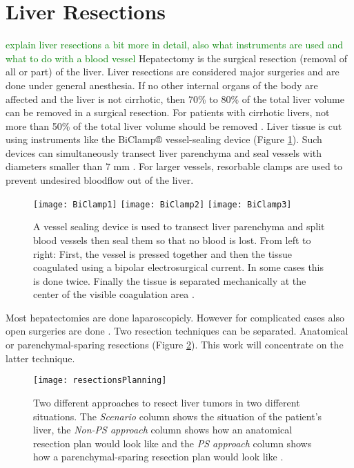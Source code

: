 \section{Liver Resections} 
\textcolor{green}{explain liver resections a bit more in detail, also what instruments are used and what to do with a blood vessel}
Hepatectomy is the surgical resection (removal of all or part) of the liver.
Liver resections are considered major surgeries and are done under general
anesthesia. If no other internal organs of the body are affected and the liver
is not cirrhotic, then 70\% to 80\% of the total liver volume can be removed in a
surgical resection. For patients with cirrhotic livers, not more than 50\% of
the total liver volume should be removed \cite{pianka2011liver}. Liver tissue is
cut using instruments like the BiClamp® vessel-sealing device (Figure \ref{fig:BiClampExplained}). Such devices can
simultaneously transect liver parenchyma and seal vessels with diameters smaller
than 7 mm \cite{zhao2017biclamp}. For larger vessels, resorbable clamps are used
to prevent undesired bloodflow out of the liver.
\begin{figure}[H]
  \centering
  \texttt{[image: BiClamp1]}
  \endminipage
  \hfill
  \texttt{[image: BiClamp2]}
  \endminipage
  \hfill
  \texttt{[image: BiClamp3]}
  \endminipage
  \hfill 
 \caption{A vessel sealing device is used to transect liver parenchyma and split
   blood vessels then seal them so that no blood is lost. From left to right:
   First, the vessel is pressed together and then the tissue coagulated using a bipolar
   electrosurgical current. In some cases this is done twice. Finally the tissue
   is separated mechanically at the center of the visible coagulation area \cite{biClampPdfWithImages}. }
  \label{fig:BiClampExplained}
\end{figure}

Most hepatectomies are done laparoscopicly. However for complicated
cases also open surgeries are done \cite{cherqui2000laparoscopic}. Two
resection techniques can be separated. Anatomical or parenchymal-sparing
resections (Figure \ref{fig:resectionsPlanning}). This work will concentrate on the latter technique. 
\begin{figure}[H]
  \centering
 \texttt{[image: resectionsPlanning]}
  \caption{Two different approaches to resect liver tumors in two different
    situations. The \textit{Scenario} column shows the situation of the
    patient's liver, the \textit{Non-PS approach} column shows how an anatomical
  resection plan would look like and the \textit{PS approach} column shows how a
parenchymal-sparing resection plan would look like \cite{alvarez2016parenchymal}.}
  \label{fig:resectionsPlanning}
\end{figure}


